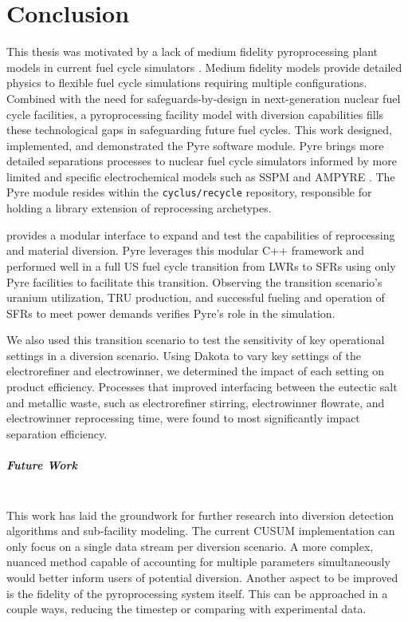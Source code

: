 \chapter{Conclusion}

This thesis was motivated by a lack of medium fidelity pyroprocessing plant models in current fuel cycle simulators \cite{borrelli_approaches_2017}. Medium fidelity models provide detailed physics to flexible fuel cycle simulations requiring multiple configurations.  Combined with 
the need for safeguards-by-design in next-generation nuclear fuel cycle facilities, a pyroprocessing facility model with diversion capabilities fills these technological gaps in safeguarding future fuel cycles.
This work designed, implemented, and demonstrated the Pyre software module.
Pyre brings more detailed separations processes to nuclear fuel cycle simulators informed by more limited and specific electrochemical models such as SSPM and AMPYRE \cite{maggos_update_2015,cipiti_modeling_2012}. The Pyre module resides within the \texttt{cyclus/recycle} repository, responsible for holding a library extension of reprocessing archetypes.

\Cyclus provides a modular interface to expand and test the capabilities of reprocessing and material diversion. Pyre leverages this
modular C++ framework and performed well in a full US fuel cycle transition from LWRs to SFRs using only Pyre facilities to facilitate
this transition. 
Observing the transition scenario's uranium utilization, TRU production, and successful fueling and operation of SFRs to
meet power demands verifies Pyre's role in the simulation.

We also used this transition scenario to test the sensitivity of key operational settings in a diversion scenario. Using Dakota to vary key settings of the electrorefiner and electrowinner, we
determined the impact of each setting on product efficiency. Processes that improved interfacing between the eutectic salt and metallic waste, such as electrorefiner stirring, electrowinner flowrate, and electrowinner reprocessing time, 
were found to most significantly impact separation efficiency. 

\paragraph{Future Work} \mbox{} \\

This work has laid the groundwork for further research into diversion detection algorithms and sub-facility modeling. The current CUSUM implementation can only focus on a single data stream per diversion scenario.
A more complex, nuanced method capable of accounting for multiple parameters simultaneously would better inform users of potential diversion. 
Another aspect to be improved is the fidelity of the pyroprocessing system itself. 
This can be approached in a couple ways, reducing the timestep or comparing with experimental data. 


